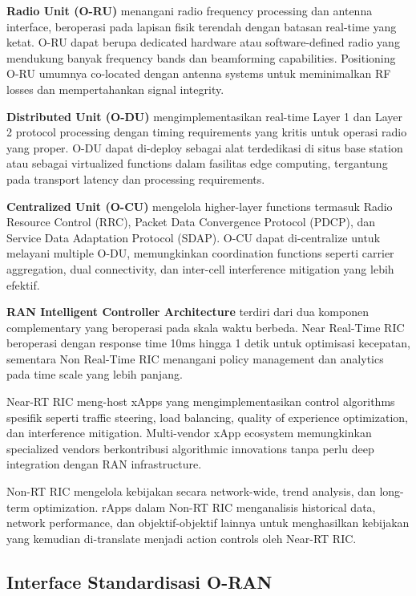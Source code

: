 \textbf{Radio Unit (O-RU)} menangani radio frequency processing dan antenna interface, beroperasi pada lapisan fisik terendah dengan batasan real-time yang ketat. O-RU dapat berupa dedicated hardware atau software-defined radio yang mendukung banyak frequency bands dan beamforming capabilities. Positioning O-RU umumnya co-located dengan antenna systems untuk meminimalkan RF losses dan mempertahankan signal integrity.

\textbf{Distributed Unit (O-DU)} mengimplementasikan real-time Layer 1 dan Layer 2 protocol processing dengan timing requirements yang kritis untuk operasi radio yang proper. O-DU dapat di-deploy sebagai alat terdedikasi di situs base station atau sebagai virtualized functions dalam fasilitas edge computing, tergantung pada transport latency dan processing requirements.

\textbf{Centralized Unit (O-CU)} mengelola higher-layer functions termasuk Radio Resource Control (RRC), Packet Data Convergence Protocol (PDCP), dan Service Data Adaptation Protocol (SDAP). O-CU dapat di-centralize untuk melayani multiple O-DU, memungkinkan coordination functions seperti carrier aggregation, dual connectivity, dan inter-cell interference mitigation yang lebih efektif.

\textbf{RAN Intelligent Controller Architecture} terdiri dari dua komponen complementary yang beroperasi pada skala waktu berbeda. Near Real-Time RIC beroperasi dengan response time 10ms hingga 1 detik untuk optimisasi kecepatan, sementara Non Real-Time RIC menangani policy management dan analytics pada time scale yang lebih panjang.

Near-RT RIC meng-host xApps yang mengimplementasikan control algorithms spesifik seperti traffic steering, load balancing, quality of experience optimization, dan interference mitigation. Multi-vendor xApp ecosystem memungkinkan specialized vendors berkontribusi algorithmic innovations tanpa perlu deep integration dengan RAN infrastructure.

Non-RT RIC mengelola kebijakan secara network-wide, trend analysis, dan long-term optimization. rApps dalam Non-RT RIC menganalisis historical data, network performance, dan objektif-objektif lainnya untuk menghasilkan kebijakan yang kemudian di-translate menjadi action controls oleh Near-RT RIC.

\subsection{Interface Standardisasi O-RAN}

